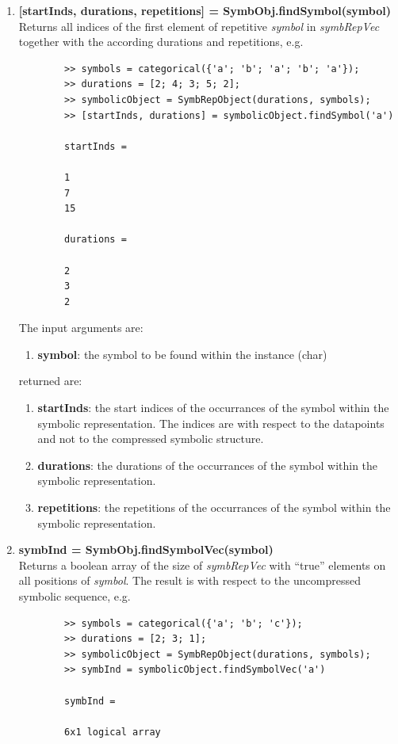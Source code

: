 \documentclass[a4]{scrreprt}
\begin{document}
\begin{enumerate}
	
	\item \textbf{[startInds, durations, repetitions] = SymbObj.findSymbol(symbol)}\\
		Returns all indices of the first element of repetitive \textit{symbol} in \textit{symbRepVec} together with the according durations and repetitions, e.g.
		\begin{verbatim}
		>> symbols = categorical({'a'; 'b'; 'a'; 'b'; 'a'});
		>> durations = [2; 4; 3; 5; 2];
		>> symbolicObject = SymbRepObject(durations, symbols);
		>> [startInds, durations] = symbolicObject.findSymbol('a')
		
		startInds =
		
		1
		7
		15	
		
		durations =
		
		2
		3
		2
		\end{verbatim}
		
		The input arguments are:
		\begin{enumerate}
			\item \textbf{symbol}: the symbol to be found within the instance (char)
		\end{enumerate}
		returned are:
		\begin{enumerate}
			\item \textbf{startInds}: the start indices of the occurrances of the symbol within the symbolic representation. The indices are with respect to the datapoints and not to the compressed symbolic structure.
			\item \textbf{durations}: the durations of the occurrances of the symbol within the symbolic representation.
			\item \textbf{repetitions}: the repetitions of the occurrances of the symbol within the symbolic representation.
		\end{enumerate}
	
	\item \textbf{symbInd = SymbObj.findSymbolVec(symbol)}\\
		Returns a boolean array of the size of \textit{symbRepVec} with ``true'' elements on all positions of \textit{symbol}. The result is with respect to the uncompressed symbolic sequence, e.g.
		\begin{verbatim}
		>> symbols = categorical({'a'; 'b'; 'c'});
		>> durations = [2; 3; 1];
		>> symbolicObject = SymbRepObject(durations, symbols);
		>> symbInd = symbolicObject.findSymbolVec('a')
		
		symbInd =
		
		6x1 logical array
		

\end{verbatim}
\end{enumerate}
\end{document}
